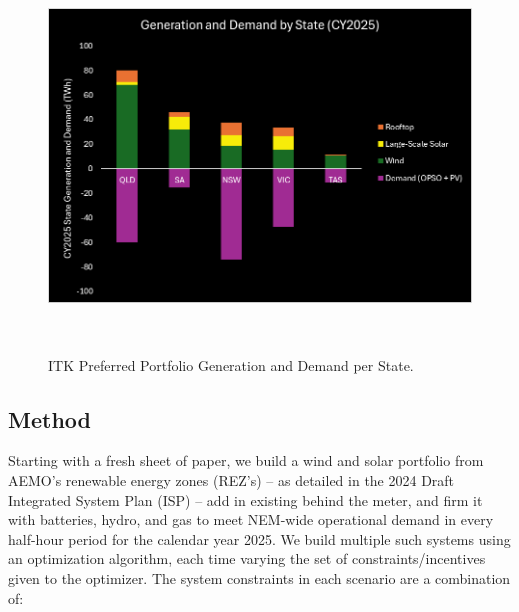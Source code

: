 \documentclass[
  letterpaper,
  DIV=11,
  numbers=noendperiod]{scrartcl}
\begin{document}
\begin{figure}[H]

{\centering \includegraphics[width=5.86736in,height=4.07361in]{./media/media/image10.png}

}

\caption[ITK Preferred Portfolio Generation and Demand per State.]{ITK Preferred Portfolio Generation and Demand\footnotemark{} per State.}

\end{figure}%

\subsection{Method}\label{method}

Starting with a fresh sheet of paper, we build a wind and solar
portfolio from AEMO's renewable energy zones (REZ's) -- as detailed in
the 2024 Draft Integrated System Plan (ISP) -- add in existing behind
the meter, and firm it with batteries, hydro, and gas to meet NEM-wide
operational demand in every half-hour period for the calendar year 2025.
We build multiple such systems using an optimization algorithm, each
time varying the set of constraints/incentives given to the optimizer.
The system constraints in each scenario are a combination of:
\end{document}
